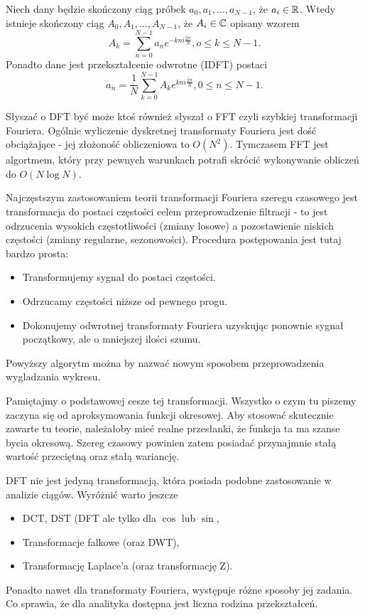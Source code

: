 \documentclass[10pt,a4paper]{book}
\begin{document}
\begin{definition}[DFT]
Niech dany będzie skończony ciąg próbek $a_0, a_1, \ldots, a_{N-1}$, że $a_i \in \mathbb{R} $. Wtedy istnieje skończony ciąg $A_0, A_1, \ldots, A_{N-1}$, że $A_i \in \mathbb{C} $ opisany wzorem
$$
A_k = \sum_{n=0}^{N-1} a_n e^{-kn i \frac{2\pi}{N}}, o \leq k \leq N-1.
$$
Ponadto dane jest przekształcenie odwrotne (IDFT) postaci
$$
a_n = \frac{1}{N} \sum_{k=0}^{N-1} A_k e^{kn i \frac{2\pi}{N}}, 0 \leq n \leq N-1.
$$
\end{definition}

Słyszać o DFT być może ktoś również słyszał o FFT czyli szybkiej transformacji Fouriera. Ogólnie wyliczenie dyskretnej transformaty Fouriera jest dość obciążające - jej złożoność obliczeniowa to $O(N^2)$. Tymczasem FFT jest algortmem, który przy pewnych warunkach potrafi skrócić wykonywanie obliczeń do $O(N \log N)$.

Najczęstszym zastosowaniem teorii transformacji Fouriera szeregu czasowego jest transformacja do postaci częstości celem przeprowadzenie filtracji - to jest odrzucenia wysokich częstotliwości (zmiany losowe) a pozostawienie niskich częstości (zmiany regularne, sezonowości). Procedura postępowania jest tutaj bardzo prosta:

\begin{itemize}
\item Transformujemy sygnał do postaci częstości.
\item Odrzucamy częstości niższe od pewnego progu.
\item Dokonujemy odwrotnej transformaty Fouriera uzyskując ponownie sygnał początkowy, ale o mniejszej ilości szumu.
\end{itemize}

Powyższy algorytm można by nazwać nowym sposobem przeprowadzenia wygladzania wykresu.

\begin{remark*}
Pamiętajmy o podstawowej cesze tej transformacji. Wszystko o czym tu piszemy zaczyna się od aproksymowania funkcji okresowej. Aby stosować skutecznie zawarte tu teorie, należałoby mieć realne przesłanki, że funkcja ta ma szanse bycia okresową. Szereg czasowy powinien zatem posiadać przynajmnie stałą wartość przeciętną oraz stałą wariancję.
\end{remark*} 

\begin{remark*}
DFT nie jest jedyną transformacją, która posiada podobne zastosowanie w analizie ciągów. Wyróżnić warto jeszcze
\begin{itemize}
\item DCT, DST (DFT ale tylko dla $\cos$ lub $\sin$,
\item Transformacje falkowe (oraz DWT),
\item Transformację Laplace'a (oraz transformację Z).
\end{itemize}
Ponadto nawet dla transformaty Fouriera, występuje różne sposoby jej zadania. Co sprawia, że dla analityka dostępna jest liczna rodzina przekształceń.
\end{remark*}
\end{document}
